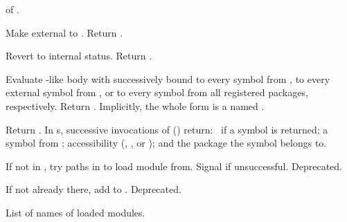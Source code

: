 \begin{LIST}{1cm}
  {
   of .
  }

  {
  Make  external to . Return \retval{\T}.
  }

  {
  Revert  to internal status. Return \retval{\T}.
  }
  
  {
  Evaluate -like body with  successively bound to every
  symbol from , to every external symbol from
  , or to every symbol from all registered packages, 
  respectively. Return .  Implicitly,
  the whole form is a  named \NIL. 
  }

  {
  Return . In s, successive
  invocations of  () return: \T\ if a symbol is returned;
  a symbol from ; accessibility
  (, , or ); and the
  package the symbol belongs to.
  }

  {
  If not in , try paths in  to load
  module from. Signal  if unsuccessful. Deprecated.
  }

  {
  If not already there, add  to
  . Deprecated. 
  }

  {
  List of names of loaded modules.
  }

\end{LIST}


